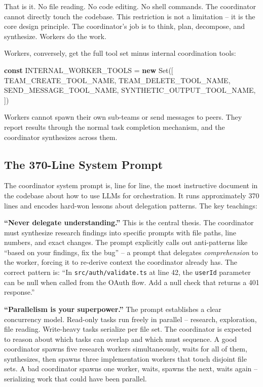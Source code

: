 \documentclass[
  english,
  11pt,
  letterpaper,
]{book}
\newenvironment{Shaded}{\begin{snugshade}}{\end{snugshade}}
\newcommand{\BuiltInTok}[1]{\textcolor[rgb]{0.00,0.23,0.31}{#1}}
\newcommand{\KeywordTok}[1]{\textcolor[rgb]{0.00,0.23,0.31}{\textbf{#1}}}
\newcommand{\NormalTok}[1]{\textcolor[rgb]{0.00,0.23,0.31}{#1}}
\newcommand{\OperatorTok}[1]{\textcolor[rgb]{0.37,0.37,0.37}{#1}}
\begin{document}
That is it. No file reading. No code editing. No shell commands. The
coordinator cannot directly touch the codebase. This restriction is not
a limitation -- it is the core design principle. The coordinator's job
is to think, plan, decompose, and synthesize. Workers do the work.

Workers, conversely, get the full tool set minus internal coordination
tools:

\begin{Shaded}
\begin{Highlighting}[]
\KeywordTok{const}\NormalTok{ INTERNAL\_WORKER\_TOOLS }\OperatorTok{=} \KeywordTok{new} \BuiltInTok{Set}\NormalTok{([}
\NormalTok{  TEAM\_CREATE\_TOOL\_NAME}\OperatorTok{,}
\NormalTok{  TEAM\_DELETE\_TOOL\_NAME}\OperatorTok{,}
\NormalTok{  SEND\_MESSAGE\_TOOL\_NAME}\OperatorTok{,}
\NormalTok{  SYNTHETIC\_OUTPUT\_TOOL\_NAME}\OperatorTok{,}
\NormalTok{])}
\end{Highlighting}
\end{Shaded}

Workers cannot spawn their own sub-teams or send messages to peers. They
report results through the normal task completion mechanism, and the
coordinator synthesizes across them.

\subsection{The 370-Line System
Prompt}\label{the-370-line-system-prompt}

The coordinator system prompt is, line for line, the most instructive
document in the codebase about how to use LLMs for orchestration. It
runs approximately 370 lines and encodes hard-won lessons about
delegation patterns. The key teachings:

\textbf{``Never delegate understanding.''} This is the central thesis.
The coordinator must synthesize research findings into specific prompts
with file paths, line numbers, and exact changes. The prompt explicitly
calls out anti-patterns like ``based on your findings, fix the bug'' --
a prompt that delegates \emph{comprehension} to the worker, forcing it
to re-derive context the coordinator already has. The correct pattern
is: ``In \texttt{src/auth/validate.ts} at line 42, the \texttt{userId}
parameter can be null when called from the OAuth flow. Add a null check
that returns a 401 response.''

\textbf{``Parallelism is your superpower.''} The prompt establishes a
clear concurrency model. Read-only tasks run freely in parallel --
research, exploration, file reading. Write-heavy tasks serialize per
file set. The coordinator is expected to reason about which tasks can
overlap and which must sequence. A good coordinator spawns five research
workers simultaneously, waits for all of them, synthesizes, then spawns
three implementation workers that touch disjoint file sets. A bad
coordinator spawns one worker, waits, spawns the next, waits again --
serializing work that could have been parallel.
\end{document}
